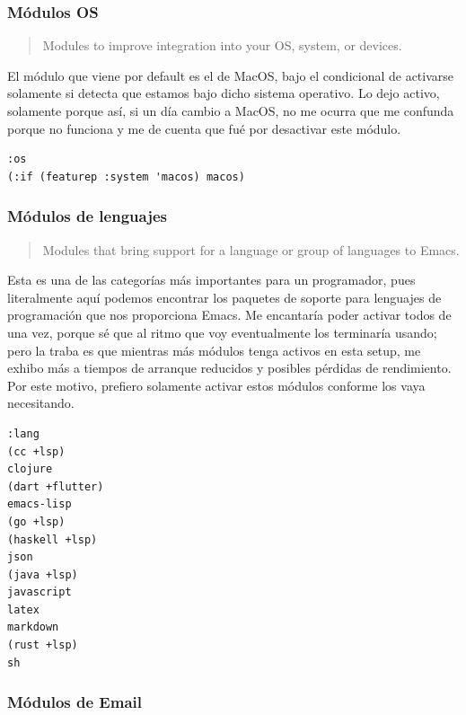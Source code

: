 \documentclass[11pt]{article}
\begin{document}
\subsubsection{Módulos OS}
\label{sec:org23b3f45}

\begin{quote}
Modules to improve integration into your OS, system, or devices.
\end{quote}

El módulo que viene por default es el de MacOS, bajo el condicional de activarse solamente si detecta que estamos bajo dicho sistema operativo. Lo dejo activo, solamente porque así, si un día cambio a MacOS, no me ocurra que me confunda porque no funciona y me de cuenta que fué por desactivar este módulo.

\begin{verbatim}
:os
(:if (featurep :system 'macos) macos)

\end{verbatim}
\subsubsection{Módulos de lenguajes}
\label{sec:orge45208f}

\begin{quote}
Modules that bring support for a language or group of languages to Emacs.
\end{quote}

Esta es una de las categorías más importantes para un programador, pues literalmente aquí podemos encontrar los paquetes de soporte para lenguajes de programación que nos proporciona Emacs. Me encantaría poder activar todos de una vez, porque sé que al ritmo que voy eventualmente los terminaría usando; pero la traba es que mientras más módulos tenga activos en esta setup, me exhibo más a tiempos de arranque reducidos y posibles pérdidas de rendimiento. Por este motivo, prefiero solamente activar estos módulos conforme los vaya necesitando.

\begin{verbatim}
:lang
(cc +lsp)
clojure
(dart +flutter)
emacs-lisp
(go +lsp)
(haskell +lsp)
json
(java +lsp)
javascript
latex
markdown
(rust +lsp)
sh

\end{verbatim}
\subsubsection{Módulos de Email}
\label{sec:org1381b5c}
\end{document}
